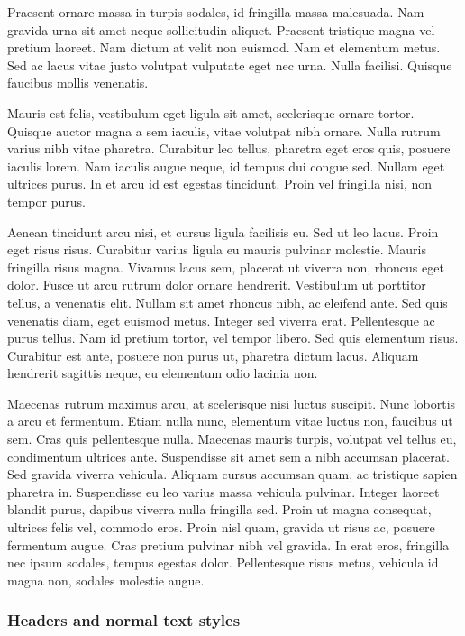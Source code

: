 \documentclass{article}
\begin{document}
Praesent ornare massa in turpis sodales, id fringilla massa malesuada. Nam gravida urna sit amet neque sollicitudin aliquet. Praesent tristique magna vel pretium laoreet. Nam dictum at velit non euismod. Nam et elementum metus. Sed ac lacus vitae justo volutpat vulputate eget nec urna. Nulla facilisi. Quisque faucibus mollis venenatis.


Mauris est felis, vestibulum eget ligula sit amet, scelerisque ornare tortor. Quisque auctor magna a sem iaculis, vitae volutpat nibh ornare. Nulla rutrum varius nibh vitae pharetra. Curabitur leo tellus, pharetra eget eros quis, posuere iaculis lorem. Nam iaculis augue neque, id tempus dui congue sed. Nullam eget ultrices purus. In et arcu id est egestas tincidunt. Proin vel fringilla nisi, non tempor purus.


Aenean tincidunt arcu nisi, et cursus ligula facilisis eu. Sed ut leo lacus. Proin eget risus risus. Curabitur varius ligula eu mauris pulvinar molestie. Mauris fringilla risus magna. Vivamus lacus sem, placerat ut viverra non, rhoncus eget dolor. Fusce ut arcu rutrum dolor ornare hendrerit. Vestibulum ut porttitor tellus, a venenatis elit. Nullam sit amet rhoncus nibh, ac eleifend ante. Sed quis venenatis diam, eget euismod metus. Integer sed viverra erat. Pellentesque ac purus tellus. Nam id pretium tortor, vel tempor libero. Sed quis elementum risus. Curabitur est ante, posuere non purus ut, pharetra dictum lacus. Aliquam hendrerit sagittis neque, eu elementum odio lacinia non.


Maecenas rutrum maximus arcu, at scelerisque nisi luctus suscipit. Nunc lobortis a arcu et fermentum. Etiam nulla nunc, elementum vitae luctus non, faucibus ut sem. Cras quis pellentesque nulla. Maecenas mauris turpis, volutpat vel tellus eu, condimentum ultrices ante. Suspendisse sit amet sem a nibh accumsan placerat. Sed gravida viverra vehicula. Aliquam cursus accumsan quam, ac tristique sapien pharetra in. Suspendisse eu leo varius massa vehicula pulvinar. Integer laoreet blandit purus, dapibus viverra nulla fringilla sed. Proin ut magna consequat, ultrices felis vel, commodo eros. Proin nisl quam, gravida ut risus ac, posuere fermentum augue. Cras pretium pulvinar nibh vel gravida. In erat eros, fringilla nec ipsum sodales, tempus egestas dolor. Pellentesque risus metus, vehicula id magna non, sodales molestie augue.


\subsubsection{Headers and normal text styles}\label{H6880234}
\end{document}
